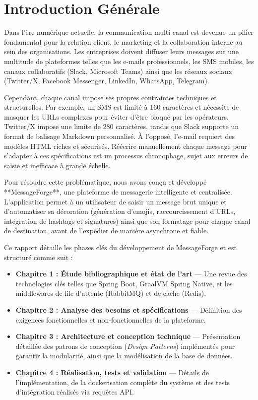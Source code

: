 \chapter*{Introduction Générale}
\label{chapter:introduction}

Dans l'ère numérique actuelle, la communication multi-canal est devenue un pilier fondamental pour la relation client, le marketing et la collaboration interne au sein des organisations. Les entreprises doivent diffuser leurs messages sur une multitude de plateformes telles que les e-mails professionnels, les SMS mobiles, les canaux collaboratifs (Slack, Microsoft Teams) ainsi que les réseaux sociaux (Twitter/X, Facebook Messenger, LinkedIn, WhatsApp, Telegram).

Cependant, chaque canal impose ses propres contraintes techniques et structurelles. Par exemple, un SMS est limité à 160 caractères et nécessite de masquer les URLs complexes pour éviter d'être bloqué par les opérateurs. Twitter/X impose une limite de 280 caractères, tandis que Slack supporte un format de balisage Markdown personnalisé. À l'opposé, l'e-mail requiert des modèles HTML riches et sécurisés. Réécrire manuellement chaque message pour s'adapter à ces spécifications est un processus chronophage, sujet aux erreurs de saisie et inefficace à grande échelle.

Pour résoudre cette problématique, nous avons conçu et développé **MessageForge**, une plateforme de messagerie intelligente et centralisée. L'application permet à un utilisateur de saisir un message brut unique et d'automatiser sa décoration (génération d'emojis, raccourcissement d'URLs, intégration de hashtags et signatures) ainsi que son formatage pour chaque canal de destination, avant de l'expédier de manière asynchrone et fiable.

Ce rapport détaille les phases clés du développement de MessageForge et est structuré comme suit :
\begin{itemize}
    \item \textbf{Chapitre 1 : Étude bibliographique et état de l'art} — Une revue des technologies clés telles que Spring Boot, GraalVM Spring Native, et les middlewares de file d'attente (RabbitMQ) et de cache (Redis).
    \item \textbf{Chapitre 2 : Analyse des besoins et spécifications} — Définition des exigences fonctionnelles et non-fonctionnelles de la plateforme.
    \item \textbf{Chapitre 3 : Architecture et conception technique} — Présentation détaillée des patrons de conception (\textit{Design Patterns}) implémentés pour garantir la modularité, ainsi que la modélisation de la base de données.
    \item \textbf{Chapitre 4 : Réalisation, tests et validation} — Détails de l'implémentation, de la dockerisation complète du système et des tests d'intégration réalisés via requêtes API.
\end{itemize}
